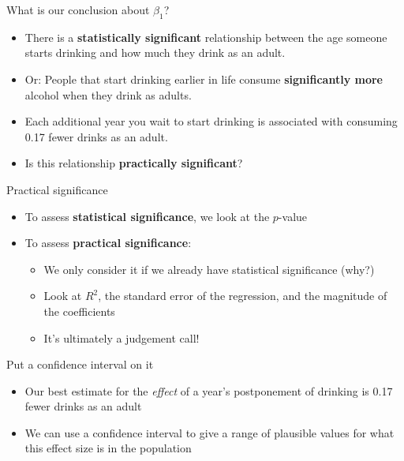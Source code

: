 \documentclass{beamer}\usepackage[]{graphicx}\usepackage[]{color}
\begin{document}
\begin{darkframes}
    \begin{frame}{What is our conclusion about $\beta_1$?}
      \begin{itemize}[<+->]
        \item There is a \textbf{statistically significant} relationship between the age someone starts drinking and how much they drink as an adult.
        \item Or: People that start drinking earlier in life consume \textbf{significantly more} alcohol when they drink as adults.
        \item Each additional year you wait to start drinking is associated with consuming 0.17 fewer drinks as an adult.
        \item Is this relationship \textbf{practically significant}?
      \end{itemize}
    \end{frame}

    \begin{frame}{Practical significance}
      \begin{itemize}
        \item To assess \textbf{statistical significance}, we look at the $p$-value
        \item To assess \textbf{practical significance}:
          \begin{itemize}
            \item We only consider it if we already have statistical significance (why?)
            \item Look at $R^2$, the standard error of the regression, and the magnitude of the coefficients
            \item It's ultimately a judgement call!
          \end{itemize}
      \end{itemize}
    \end{frame}

    \begin{frame}{Put a confidence interval on it}
      \begin{itemize}[<+->]
        \item Our best estimate for the \emph{effect} of a year's postponement of drinking is 0.17 fewer drinks as an adult
        \item We can use a confidence interval to give a range of plausible values for what this effect size is in the population
      \end{itemize}
    \end{frame}


\end{darkframes}
\end{document}
